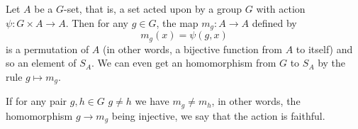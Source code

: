 \documentclass[12pt]{article}
\begin{document}
Let $A$ be a $G$-set, that is, a set acted upon by a group $G$ with action
$\psi:G\times A\to A$.  Then for any $g\in G$, the map $m_g\colon A\to A$ defined by
\[m_g(x)= \psi(g,x)\]
is a permutation of $A$ (in other words, a bijective function from $A$ to itself) and so an element of $S_A$.
We can even get an homomorphism from $G$ to $S_A$ by the rule $g\mapsto m_g$.

If for any pair $g,h\in G$  $g\neq h$ we have
$m_g\neq m_h$, in other words, the homomorphism $g\to m_g$ being injective, we say that the action is faithful.
\end{document}
